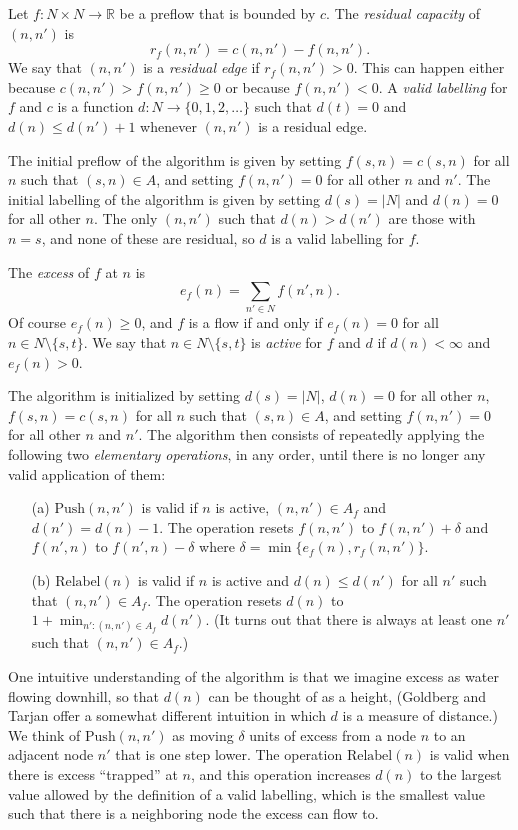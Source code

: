 \documentclass[12pt]{article}
\theoremstyle{definition}
\renewcommand{\Re}{\mathbb{R}}
\begin{document}
\begin{appendix}
Let $f \colon N \times N \to \Re$ be a preflow that is bounded by $c$.
The \emph{residual capacity} of $(n,n')$ is $$r_f(n,n') = c(n,n') -
f(n,n').$$ We say that $(n,n')$ is a \emph{residual edge} if
$r_f(n,n') > 0$.  This can happen either because $c(n,n') > f(n,n')
\ge 0$ or because $f(n,n') < 0$.  A \emph{valid labelling} for $f$ and
$c$ is a function $d \colon N \to \{0,1,2,\ldots\}$
such that $d(t) = 0$ and $d(n) \le d(n') + 1$ whenever $(n,n')$ is a
residual edge.

The initial preflow of the algorithm is given by setting $f(s,n) =
c(s,n)$ for all $n$ such that $(s,n) \in A$, and setting $f(n,n') = 0$
for all other $n$ and $n'$.  The initial labelling of the algorithm is
given by setting $d(s) = |N|$ and $d(n) = 0$ for all other $n$.  The
only $(n,n')$ such that $d(n) > d(n')$ are those with $n = s$, and
none of these are residual, so $d$ is a valid labelling for $f$.

The \emph{excess} of $f$ at $n$ is $$e_f(n) = \sum_{n' \in N}
f(n',n).$$ Of course $e_f(n) \ge 0$, and $f$ is a flow if and only if
$e_f(n) = 0$ for all $n \in N \setminus \{s,t\}$.  We say that $n \in
N \setminus \{s,t\}$ is \emph{active} for $f$ and $d$ if $d(n) <
\infty$ and $e_f(n) > 0$.

The algorithm is initialized by setting $d(s) = |N|$, $d(n) = 0$ for
all other $n$, $f(s,n) = c(s,n)$ for all $n$ such that $(s,n) \in A$,
and setting $f(n,n') = 0$ for all other $n$ and $n'$.  The algorithm
then consists of repeatedly applying the following two
\emph{elementary operations}, in any order, until there is no longer
any valid application of them:
\begin{enumerate}
  \item[(a)] $\mathrm{Push}(n,n')$ is valid if $n$ is active, $(n,n')
    \in A_f$ and $d(n') = d(n) - 1$.  The operation resets $f(n,n')$
    to $f(n,n') + \delta$ and $f(n',n)$ to $f(n',n) - \delta$ where
    $\delta = \min\{e_f(n),r_f(n,n')\}$.
  \item[(b)] $\mathrm{Relabel}(n)$ is valid if $n$ is active and $d(n)
    \le d(n')$ for all $n'$ such that $(n,n') \in A_f$.  The operation
    resets $d(n)$ to $1 + \min_{n' : (n,n') \in A_f} d(n')$.  (It
    turns out that there is always at least one $n'$ such that $(n,n')
    \in A_f$.)
\end{enumerate}
One intuitive understanding of the algorithm is that we imagine excess
as water flowing downhill, so that $d(n)$ can be thought of as a
height, (Goldberg and Tarjan offer a somewhat different intuition in
which $d$ is a measure of distance.) We think of $\mathrm{Push}(n,n')$
as moving $\delta$ units of excess from a node $n$ to an adjacent node
$n'$ that is one step lower.  The operation $\mathrm{Relabel}(n)$ is
valid when there is excess ``trapped'' at $n$, and this operation
increases $d(n)$ to the largest value allowed by the definition of a
valid labelling, which is the smallest value such that there is a
neighboring node the excess can flow to.


\end{appendix}
\end{document}
